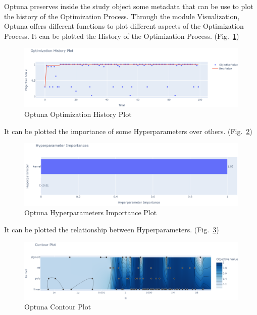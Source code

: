 Optuna preserves inside the study object some metadata that can be use to plot the history of the Optimization Process.
Through the module Visualization, Optuna offers different functions to plot different aspects of the Optimization Process.
\newline It can be plotted the History of the Optimization Process. (Fig.~\ref{fig:figure-2.5.1})
\begin{figure}[t]
	\centering
	\includegraphics[width=16cm]{figures/figure-2.5.1.png}
	\caption[Optuna Optimization History Plot]{Optuna Optimization History Plot}
	\label{fig:figure-2.5.1}
\end{figure}
\newline It can be plotted the importance of some Hyperparameters over others. (Fig.~\ref{fig:figure-2.5.2})
\begin{figure}[t]
	\centering
	\includegraphics[width=16cm]{figures/figure-2.5.2.png}
	\caption[Optuna Hyperparameters Importance]{Optuna Hyperparameters Importance Plot}
	\label{fig:figure-2.5.2}
\end{figure}
\newline It can be plotted the relationship between Hyperparameters. (Fig.~\ref{fig:figure-2.5.3})
\begin{figure}[t]
	\centering
	\includegraphics[width=15cm]{figures/figure-2.5.3.png}
	\caption[Optuna Contour Plot]{Optuna Contour Plot}
	\label{fig:figure-2.5.3}
\end{figure}

